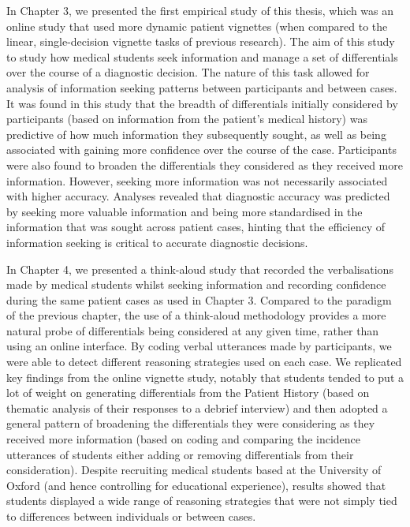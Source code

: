 \documentclass[a4paper, nobind]{templates/ociamthesis}
\begin{document}
In Chapter 3, we presented the first empirical study of this thesis, which was an online study that used more dynamic patient vignettes (when compared to the linear, single-decision vignette tasks of previous research). The aim of this study to study how medical students seek information and manage a set of differentials over the course of a diagnostic decision. The nature of this task allowed for analysis of information seeking patterns between participants and between cases. It was found in this study that the breadth of differentials initially considered by participants (based on information from the patient's medical history) was predictive of how much information they subsequently sought, as well as being associated with gaining more confidence over the course of the case. Participants were also found to broaden the differentials they considered as they received more information. However, seeking more information was not necessarily associated with higher accuracy. Analyses revealed that diagnostic accuracy was predicted by seeking more valuable information and being more standardised in the information that was sought across patient cases, hinting that the efficiency of information seeking is critical to accurate diagnostic decisions.

In Chapter 4, we presented a think-aloud study that recorded the verbalisations made by medical students whilst seeking information and recording confidence during the same patient cases as used in Chapter 3. Compared to the paradigm of the previous chapter, the use of a think-aloud methodology provides a more natural probe of differentials being considered at any given time, rather than using an online interface. By coding verbal utterances made by participants, we were able to detect different reasoning strategies used on each case. We replicated key findings from the online vignette study, notably that students tended to put a lot of weight on generating differentials from the Patient History (based on thematic analysis of their responses to a debrief interview) and then adopted a general pattern of broadening the differentials they were considering as they received more information (based on coding and comparing the incidence utterances of students either adding or removing differentials from their consideration). Despite recruiting medical students based at the University of Oxford (and hence controlling for educational experience), results showed that students displayed a wide range of reasoning strategies that were not simply tied to differences between individuals or between cases.
\end{document}
